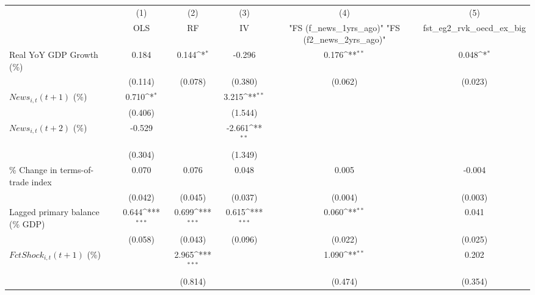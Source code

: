{
\def\sym#1{\ifmmode^{#1}\else\(^{#1}\)\fi}
\begin{tabular}{l*{5}{c}}
\toprule
                    &\multicolumn{1}{c}{(1)}&\multicolumn{1}{c}{(2)}&\multicolumn{1}{c}{(3)}&\multicolumn{1}{c}{(4)}&\multicolumn{1}{c}{(5)}\\
                    &\multicolumn{1}{c}{OLS}&\multicolumn{1}{c}{RF}&\multicolumn{1}{c}{IV}&\multicolumn{1}{c}{ "FS (f_news_1yrs_ago)"  "FS (f2_news_2yrs_ago)" }&\multicolumn{1}{c}{fst_eg2_rvk_oecd_ex_big}\\
\midrule
Real YoY GDP Growth (\%)&       0.184         &       0.144\sym{*}  &      -0.296         &       0.176\sym{**} &       0.048\sym{*}  \\
                    &     (0.114)         &     (0.078)         &     (0.380)         &     (0.062)         &     (0.023)         \\
\addlinespace
$ News_{i,t}(t+1)$ (\%)&       0.710\sym{*}  &                     &       3.215\sym{**} &                     &                     \\
                    &     (0.406)         &                     &     (1.544)         &                     &                     \\
\addlinespace
$ News_{i,t}(t+2)$ (\%)&      -0.529         &                     &      -2.661\sym{**} &                     &                     \\
                    &     (0.304)         &                     &     (1.349)         &                     &                     \\
\addlinespace
\% Change in terms-of-trade index&       0.070         &       0.076         &       0.048         &       0.005         &      -0.004         \\
                    &     (0.042)         &     (0.045)         &     (0.037)         &     (0.004)         &     (0.003)         \\
\addlinespace
Lagged primary balance (\% GDP)&       0.644\sym{***}&       0.699\sym{***}&       0.615\sym{***}&       0.060\sym{**} &       0.041         \\
                    &     (0.058)         &     (0.043)         &     (0.096)         &     (0.022)         &     (0.025)         \\
\addlinespace
$ FctShock_{i,t}(t+1)$ (\%)&                     &       2.965\sym{***}&                     &       1.090\sym{**} &       0.202         \\
                    &                     &     (0.814)         &                     &     (0.474)         &     (0.354)         \\

\end{tabular}}

